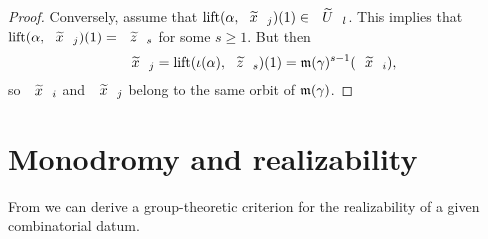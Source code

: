 \begin{proof}
Conversely, assume that $\lift{\alpha}{\wtilde{x}_j}(1)\in\wtilde{U}_l$. This implies that $\lift{\alpha}{\wtilde{x}_j}(1)=\wtilde{z}_s$ for some $s\ge 1$. But then
\[
\wtilde{x}_j=\lift{\invpath{\alpha}}{\wtilde{z}_s}(1)=\Mon(\gamma)^{s-1}(\wtilde{x}_i),
\]
so $\wtilde{x}_i$ and $\wtilde{x}_j$ belong to the same orbit of $\mathfrak{m}(\gamma)$.
\end{proof}

\section{Monodromy and realizability}

From  we can derive a group-theoretic criterion for the realizability of a given combinatorial datum.

